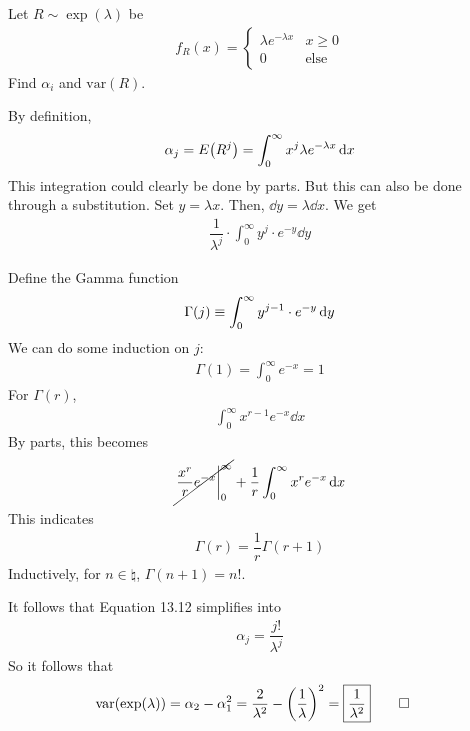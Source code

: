 \begin{example}
    Let $R \sim \exp(\lambda)$ be
    \begin{align}
        f_R(x) = \begin{cases}
            \lambda e^{-\lambda x} & x \ge 0\\
            0 & \text{else}
        \end{cases}
    \end{align}
    Find $\alpha_i$ and $\text{var}(R)$.
\end{example}
\begin{solution}
    By definition,
    \begin{align}
        \alpha_j = E\qty(R^j) = \int_0^\infty x^j \lambda e^{-\lambda x} \dd{x}
    \end{align}
    This integration could clearly be done by parts. But this can also be done through a substitution. Set $y = \lambda x$. Then, $\dd{y} = \lambda \dd{x}$. We get
    \begin{align}
        \dfrac{1}{\lambda^j} \cdot \int_0^\infty y^j \cdot e^{-y} \dd{y}
    \end{align}
    \begin{aside}
        Define the Gamma function
        \begin{align}
            \Gamma\qty(j) \equiv \int_0^\infty y^{j-1} \cdot e^{-y} \dd{y}
        \end{align}
        We can do some induction on $j$:
        \begin{align}
            \Gamma(1) = \int_0^\infty e^{-x} = 1
        \end{align}
        For $\Gamma(r)$,
        \begin{align}
            \int_0^\infty x^{r-1} e^{-x} \dd{x}
        \end{align}
        By parts, this becomes
        \begin{align}
            \cancel{\eval{\frac{x^r}{r} e^{-x}}_0^\infty} + \frac{1}{r} \int_0^\infty x^r e^{-x} \dd{x}
        \end{align}
        This indicates
        \begin{align}
            \Gamma(r) = \dfrac{1}{r} \Gamma(r+1)
        \end{align}
        Inductively, for $n \in \natural$, $\Gamma(n + 1) = n!$.
    \end{aside}
    It follows that Equation 13.12 simplifies into
    \begin{align}
        \alpha_j = \dfrac{j!}{\lambda^j}
    \end{align}
    So it follows that
    \begin{align}
        \text{var}\qty(\exp(\lambda)) = \alpha_2 - \alpha_1^2 = \dfrac{2}{\lambda^2} - \qty(\dfrac{1}{\lambda})^2 = \boxed{\dfrac{1}{\lambda^2}} & \qedhere
    \end{align}
\end{solution}

